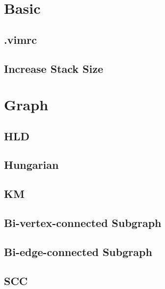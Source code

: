 \documentclass[10pt,twocolumn,oneside]{article}
\begin{document}
\pagestyle{fancy}
\fancyfoot{}
\fancyhead[R]{\thepage}
\renewcommand{\headrulewidth}{0.4pt}
\renewcommand{\contentsname}{Contents} 


\tableofcontents

\newpage

\section{Basic}
\subsection{.vimrc}


\subsection{Increase Stack Size}



\section{Graph}
\subsection{HLD}

\subsection{Hungarian}

\subsection{KM}

\subsection{Bi-vertex-connected Subgraph}

\subsection{Bi-edge-connected Subgraph}

\subsection{SCC}

\end{document}
